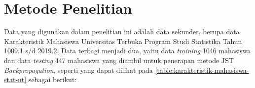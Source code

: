 \section{Metode Penelitian} %


Data yang digunakan dalam penelitian ini adalah data sekunder, berupa data Karakteristik Mahasiswa Universitas Terbuka Program Studi Statistika Tahun 1009.1 s/d 2019.2. Data terbagi menjadi dua, yaitu data \textit{training} 1046 mahasiswa dan data \textit{testing} 447 mahasiswa yang diambil untuk penerapan metode JST \textit{Backpropagation}, seperti yang dapat dilihat pada \autoref{table:karakteristik-mahasiswa-stat-ut} sebagai berikut:

